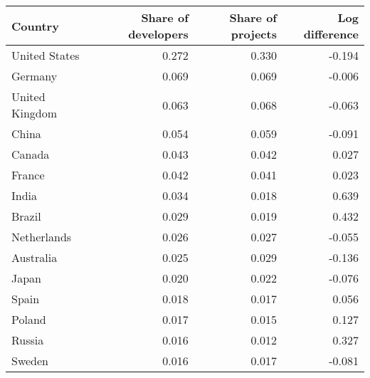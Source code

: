 \begin{tabular}{lrrr}
  \hline
Country & Share of developers & Share of projects & Log difference \\ 
  \hline
United States & 0.272 & 0.330 & -0.194 \\ 
  Germany & 0.069 & 0.069 & -0.006 \\ 
  United Kingdom & 0.063 & 0.068 & -0.063 \\ 
  China & 0.054 & 0.059 & -0.091 \\ 
  Canada & 0.043 & 0.042 & 0.027 \\ 
  France & 0.042 & 0.041 & 0.023 \\ 
  India & 0.034 & 0.018 & 0.639 \\ 
  Brazil & 0.029 & 0.019 & 0.432 \\ 
  Netherlands & 0.026 & 0.027 & -0.055 \\ 
  Australia & 0.025 & 0.029 & -0.136 \\ 
  Japan & 0.020 & 0.022 & -0.076 \\ 
  Spain & 0.018 & 0.017 & 0.056 \\ 
  Poland & 0.017 & 0.015 & 0.127 \\ 
  Russia & 0.016 & 0.012 & 0.327 \\ 
  Sweden & 0.016 & 0.017 & -0.081 \\ 
   \hline
\end{tabular}
